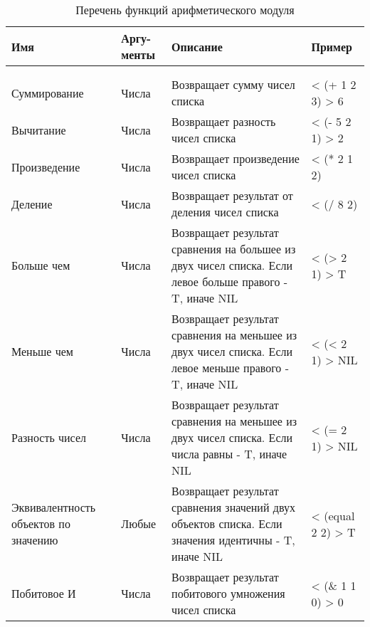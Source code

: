 \begin{xltabular}{\textwidth}{|p{3.6cm}|p{2cm}|p{6cm}|X|}
	\caption{Перечень функций арифметического модуля\label{funcprimarith:table}}\\ \hline
	\centrow Имя & \centrow Аргу- \linebreak менты & \centrow Описание & \centrow Пример \\ \hline
	 &  &  &  \\ \hline
	\endfirsthead
	 &  &  &  \\ \hline
	\finishhead
	Суммирование & Числа & Возвращает сумму чисел списка & < (+ 1 2 3) \linebreak > 6 \\ \hline 
	Вычитание & Числа & Возвращает разность чисел списка & < (- 5 2 1) \linebreak > 2 \\ \hline 
	Произведение & Числа & Возвращает произведение чисел списка & < (* 2 1 2)  \\ \hline 
	Деление & Числа & Возвращает результат от деления чисел списка & < (/ 8 2)  \\ \hline 
	Больше чем & Числа & Возвращает результат сравнения на большее из двух чисел списка. Если левое больше правого - T, иначе NIL & < (> 2 1) \linebreak > T \\ \hline 
	Меньше чем & Числа & Возвращает результат сравнения на меньшее из двух чисел списка. Если левое меньше правого - T, иначе NIL & < (< 2 1) \linebreak > NIL \\ \hline 
	Разность чисел & Числа & Возвращает результат сравнения на меньшее из двух чисел списка. Если числа равны - T, иначе NIL & < (= 2 1) \linebreak > NIL \\ \hline 
	Эквивалентность объектов по значению & Любые & Возвращает результат сравнения значений двух объектов списка. Если значения идентичны - T, иначе NIL & < (equal 2 2) \linebreak > T \\ \hline 
	Побитовое И & Числа & Возвращает результат побитового умножения чисел списка & < (\& 1 1 0) \linebreak > 0 \\ \hline 

\end{xltabular}
